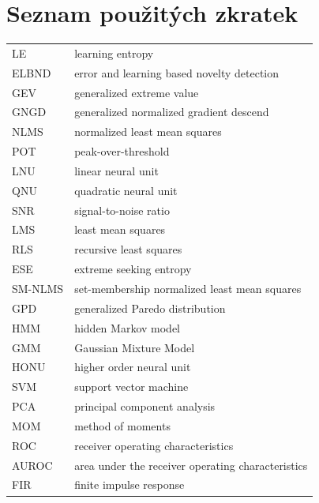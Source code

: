 
\cleardoublepage
\thispagestyle{empty}

\chapter*{Seznam použitých zkratek}
\begin{tabular}{ll}
LE                      & learning entropy                              \\
ELBND                   & error and learning based novelty detection      \\
GEV                     & generalized extreme value                       \\
GNGD                    & generalized normalized gradient descend         \\
NLMS                    & normalized least mean squares                   \\
POT                     & peak-over-threshold                             \\
LNU                     & linear neural unit                              \\
QNU                     & quadratic neural unit                           \\
SNR                     & signal-to-noise ratio                           \\
LMS						& least mean squares							\\
RLS                     & recursive least squares                         \\
ESE                     & extreme seeking entropy                         \\
SM-NLMS                 & set-membership normalized least mean squares \\
GPD						& generalized Paredo distribution \\
HMM						& hidden Markov model \\
GMM						& Gaussian Mixture Model \\
HONU					& higher order neural unit \\
SVM						& support vector machine \\
PCA						& principal component analysis \\
MOM						& method of moments \\
ROC						& receiver operating characteristics \\
AUROC					& area under the receiver operating characteristics\\
FIR						& finite impulse response \\


\end{tabular}

